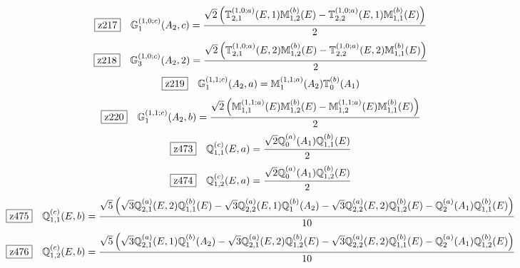 \documentclass[fleqn,10pt,landscape]{jsarticle}
\begin{document}
\begin{dmath*}
\hspace*{3mm}\fbox{z217}\quad \mathbb{G}_{1}^{(1,0;c)}(A_{2},c)=\frac{\sqrt{2} \left(\mathbb{T}_{2,1}^{(1,0;a)}(E,1) \mathbb{M}_{1,2}^{(b)}(E) - \mathbb{T}_{2,2}^{(1,0;a)}(E,1) \mathbb{M}_{1,1}^{(b)}(E)\right)}{2}
\end{dmath*}
\begin{dmath*}
\hspace*{3mm}\fbox{z218}\quad \mathbb{G}_{3}^{(1,0;c)}(A_{2},2)=\frac{\sqrt{2} \left(\mathbb{T}_{2,1}^{(1,0;a)}(E,2) \mathbb{M}_{1,2}^{(b)}(E) - \mathbb{T}_{2,2}^{(1,0;a)}(E,2) \mathbb{M}_{1,1}^{(b)}(E)\right)}{2}
\end{dmath*}
\begin{dmath*}
\hspace*{3mm}\fbox{z219}\quad \mathbb{G}_{1}^{(1,1;c)}(A_{2},a)=\mathbb{M}_{1}^{(1,1;a)}(A_{2}) \mathbb{T}_{0}^{(b)}(A_{1})
\end{dmath*}
\begin{dmath*}
\hspace*{3mm}\fbox{z220}\quad \mathbb{G}_{1}^{(1,1;c)}(A_{2},b)=\frac{\sqrt{2} \left(\mathbb{M}_{1,1}^{(1,1;a)}(E) \mathbb{M}_{1,2}^{(b)}(E) - \mathbb{M}_{1,2}^{(1,1;a)}(E) \mathbb{M}_{1,1}^{(b)}(E)\right)}{2}
\end{dmath*}
\begin{dmath*}
\hspace*{3mm}\fbox{z473}\quad \mathbb{Q}_{1,1}^{(c)}(E,a)=\frac{\sqrt{2} \mathbb{Q}_{0}^{(a)}(A_{1}) \mathbb{Q}_{1,1}^{(b)}(E)}{2}
\end{dmath*}
\begin{dmath*}
\hspace*{3mm}\fbox{z474}\quad \mathbb{Q}_{1,2}^{(c)}(E,a)=\frac{\sqrt{2} \mathbb{Q}_{0}^{(a)}(A_{1}) \mathbb{Q}_{1,2}^{(b)}(E)}{2}
\end{dmath*}
\begin{dmath*}
\hspace*{3mm}\fbox{z475}\quad \mathbb{Q}_{1,1}^{(c)}(E,b)=\frac{\sqrt{5} \left(\sqrt{3} \mathbb{Q}_{2,1}^{(a)}(E,2) \mathbb{Q}_{1,1}^{(b)}(E) - \sqrt{3} \mathbb{Q}_{2,2}^{(a)}(E,1) \mathbb{Q}_{1}^{(b)}(A_{2}) - \sqrt{3} \mathbb{Q}_{2,2}^{(a)}(E,2) \mathbb{Q}_{1,2}^{(b)}(E) - \mathbb{Q}_{2}^{(a)}(A_{1}) \mathbb{Q}_{1,1}^{(b)}(E)\right)}{10}
\end{dmath*}
\begin{dmath*}
\hspace*{3mm}\fbox{z476}\quad \mathbb{Q}_{1,2}^{(c)}(E,b)=\frac{\sqrt{5} \left(\sqrt{3} \mathbb{Q}_{2,1}^{(a)}(E,1) \mathbb{Q}_{1}^{(b)}(A_{2}) - \sqrt{3} \mathbb{Q}_{2,1}^{(a)}(E,2) \mathbb{Q}_{1,2}^{(b)}(E) - \sqrt{3} \mathbb{Q}_{2,2}^{(a)}(E,2) \mathbb{Q}_{1,1}^{(b)}(E) - \mathbb{Q}_{2}^{(a)}(A_{1}) \mathbb{Q}_{1,2}^{(b)}(E)\right)}{10}
\end{dmath*}
\end{document}
